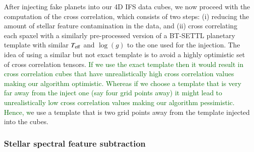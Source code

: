 \documentclass[referee]{aa} %
\newcommand{\newchange}[1]{\textcolor{darkgreen}{#1}}
\begin{document}
After injecting fake planets into our 4D IFS data cubes, we now proceed with the computation of the cross correlation, which consists of two steps: (i) reducing the amount of stellar feature contamination in the data, and (ii) cross correlating each spaxel with a similarly pre-processed version of a BT-SETTL planetary template with similar $T_{\rm eff}$ and $\log(g)$ to the one used for the injection.
The idea of using a similar but not exact template is to avoid a highly optimistic set of cross correlation tensors.
\newchange{If we use the exact template then it would result in cross correlation cubes that have unrealistically high cross correlation values making our algorithm optimistic. 
Whereas if we choose a template that is very far away from the inject one (say four grid points away) it might lead to unrealistically low cross correlation values making our algorithm pessimistic.}
\newchange{Hence, w}e use a template that is two grid points away from the template injected into the cubes.

\subsubsection{Stellar spectral feature subtraction}
\end{document}
